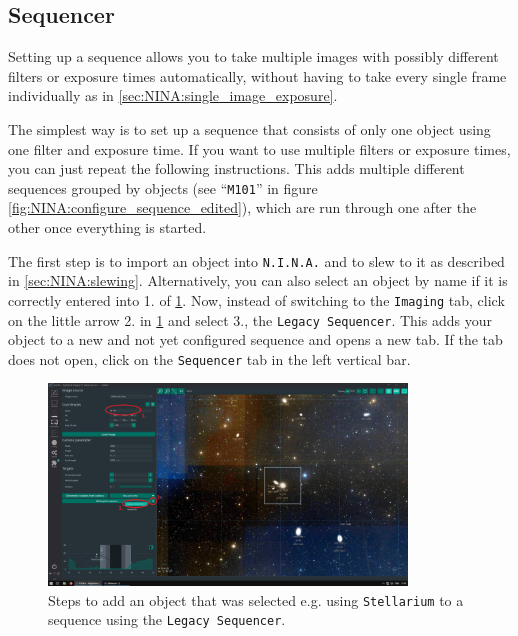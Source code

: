 \documentclass[a4paper, 11pt, fleqn]{memoir}
\begin{document}
\subsection{Sequencer}

Setting up a sequence allows you to take multiple images with possibly different filters or exposure times automatically, without having to take every single frame individually as in \ref{sec:NINA:single_image_exposure}. 

The simplest way is to set up a sequence that consists of only one object using one filter and exposure time. If you want to use multiple filters or exposure times, you can just repeat the following instructions. This adds multiple different sequences grouped by objects (see ``\texttt{M101}'' in figure \ref{fig:NINA:configure_sequence_edited}), which are run through one after the other once everything is started.

The first step is to import an object into \texttt{N.I.N.A.} and to slew to it as described in \ref{sec:NINA:slewing}. Alternatively, you can also select an object by name if it is correctly entered into 1. of \ref{fig:NINA:add_to_sequence_edited}. Now, instead of switching to the \texttt{Imaging} tab, click on the little arrow 2. in \ref{fig:NINA:add_to_sequence_edited} and select 3., the \texttt{Legacy Sequencer}. This adds your object to a new and not yet configured sequence and opens a new tab. If the tab does not open, click on the \texttt{Sequencer} tab in the left vertical bar.

\begin{figure}
    \centering
    \includegraphics[width=0.85\textwidth]{figures/NINA/add_to_sequence_edited.png}
    \caption{Steps to add an object that was selected e.g. using \texttt{Stellarium} to a sequence using the \texttt{Legacy Sequencer}.}
    \label{fig:NINA:add_to_sequence_edited}
\end{figure}
\end{document}
